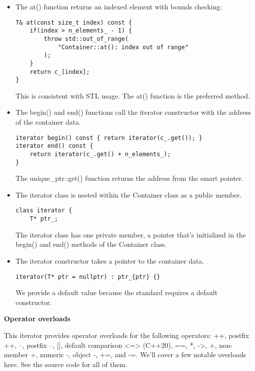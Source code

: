 \begin{itemize}
\item 
The at() function returns an indexed element with bounds checking:

\begin{lstlisting}[style=styleCXX]
T& at(const size_t index) const {
	if(index > n_elements_ - 1) {
		throw std::out_of_range(
			"Container::at(): index out of range"
		);
	}
	return c_[index];
}
\end{lstlisting}

This is consistent with STL usage. The at() function is the preferred method.

\item 
The begin() and end() functions call the iterator constructor with the address of the container data.

\begin{lstlisting}[style=styleCXX]
iterator begin() const { return iterator(c_.get()); }
iterator end() const {
	return iterator(c_.get() + n_elements_);
}
\end{lstlisting}

The unique\_ptr::get() function returns the address from the smart pointer.

\item 
The iterator class is nested within the Container class as a public member.

\begin{lstlisting}[style=styleCXX]
class iterator {
	T* ptr_;
\end{lstlisting}

The iterator class has one private member, a pointer that's initialized in the begin() and end() methods of the Container class.

\item 
The iterator constructor takes a pointer to the container data.

\begin{lstlisting}[style=styleCXX]
iterator(T* ptr = nullptr) : ptr_{ptr} {}
\end{lstlisting}

We provide a default value because the standard requires a default constructor.
\end{itemize}

\noindent
\textbf{Operator overloads}

This iterator provides operator overloads for the following operators: ++, postfix ++, --, postfix --, [], default comparison <=> (C++20), ==, *, ->, +, non-member +, numeric -, object -, +=, and -=. We'll cover a few notable overloads here. See the source code for all of them.

